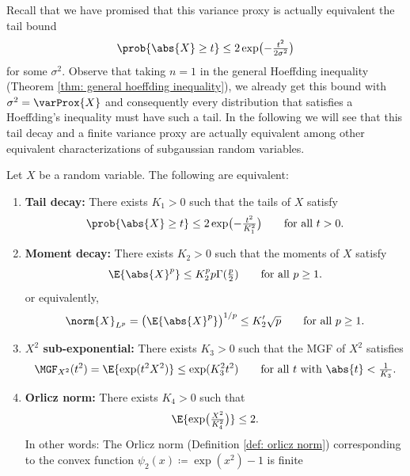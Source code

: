 Recall that we have promised that this variance proxy is actually equivalent
the tail bound
\[
    \prob{\abs{X} \ge t} \le 2 \exp\bigl(-\tfrac{t^2}{2\sigma^2}\bigr)
\]
for some \(\sigma^2\).  Observe that taking \(n=1\) in the general Hoeffding
inequality (Theorem \ref{thm: general hoeffding inequality}), we already get
this bound with \(\sigma^2 = \varProx{X}\) and consequently every distribution that satisfies a Hoeffding's
inequality must have such a tail. In the following we will see that
this tail decay and a finite variance proxy are actually equivalent among other
equivalent characterizations of subgaussian random variables.

\begin{mdframed}[innertopmargin=0pt]
\begin{theorem}
    \label{thm: subgaussian equivalences}
    Let \(X\) be a random variable. The following are equivalent:
    \begin{enumerate}[label=(\roman*), noitemsep]
        \item\label{it: subgaussian tail decay}
        \textbf{Tail decay:} There exists \(K_1 > 0\) such that the tails of \(X\) satisfy
        \[
            \prob{\abs{X} \ge t} \le 2 \exp\bigl(-\tfrac{t^2}{K_1^2}\bigr)
            \qquad\text{for all } t > 0.
        \]
        \item\label{it: subgaussian moment decay}
        \textbf{Moment decay:} There exists \(K_2 > 0\) such that the moments of \(X\) satisfy
        \[
            \E{\abs{X}^p} \le K_2^p p \Gamma(\tfrac{p}2)
            \qquad\text{for all } p\ge 1.
        \]
        or equivalently,
        \[
            \norm{X}_{L^p} = \bigl(\E{\abs{X}^p}\bigr)^{1/p} \le K_2' \sqrt{p}
            \qquad\text{for all } p\ge 1.
        \]
        \item\label{it: subgaussian X^2 sub-exponential}
        \textbf{\(X^2\) sub-exponential:} There exists \(K_3 >0\) such that the MGF of \(X^2\) satisfies
        \[
            \MGF_{X^2}(t^2) = \E{\exp(t^2 X^2)} \le \exp(K_3^2 t^2)
            \qquad\text{for all } t \text{ with } \abs{t} < \tfrac1{K_3}.
        \]
        \item\label{it: subgaussian orlicz norm}
        \textbf{Orlicz norm:} There exists \(K_4 > 0\) such that
        \[
            \E{\exp\bigl(\tfrac{X^2}{K_4^2}\bigr)} \le 2.
        \]
        In other words: The Orlicz norm (Definition \ref{def: orlicz norm})
        corresponding to the convex function \(\psi_2(x) \coloneq \exp(x^2) - 1\) is finite

\end{enumerate}
\end{theorem}
\end{mdframed}
